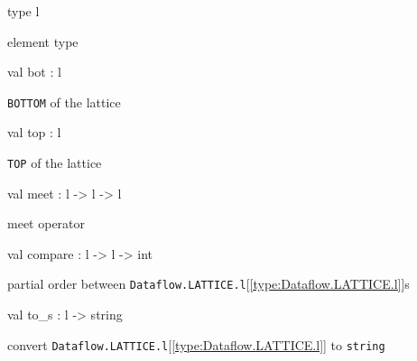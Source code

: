 \documentclass[11pt]{article}
\begin{document}
\begin{ocamldocsigend}


\label{type:Dataflow.LATTICE.l}\begin{ocamldoccode}
type l 
\end{ocamldoccode}
\begin{ocamldocdescription}
element type


\end{ocamldocdescription}


\label{val:Dataflow.LATTICE.bot}\begin{ocamldoccode}
val bot : l
\end{ocamldoccode}
\begin{ocamldocdescription}
{\tt{BOTTOM}} of the lattice


\end{ocamldocdescription}


\label{val:Dataflow.LATTICE.top}\begin{ocamldoccode}
val top : l
\end{ocamldoccode}
\begin{ocamldocdescription}
{\tt{TOP}} of the lattice


\end{ocamldocdescription}


\label{val:Dataflow.LATTICE.meet}\begin{ocamldoccode}
val meet : l -> l -> l
\end{ocamldoccode}
\begin{ocamldocdescription}
meet operator


\end{ocamldocdescription}


\label{val:Dataflow.LATTICE.compare}\begin{ocamldoccode}
val compare : l -> l -> int
\end{ocamldoccode}
\begin{ocamldocdescription}
partial order between {\tt{Dataflow.LATTICE.l}}[\ref{type:Dataflow.LATTICE.l}]s


\end{ocamldocdescription}


\label{val:Dataflow.LATTICE.to-underscores}\begin{ocamldoccode}
val to_s : l -> string
\end{ocamldoccode}
\begin{ocamldocdescription}
convert {\tt{Dataflow.LATTICE.l}}[\ref{type:Dataflow.LATTICE.l}] to {\tt{string}}


\end{ocamldocdescription}
\end{ocamldocsigend}
\end{document}
